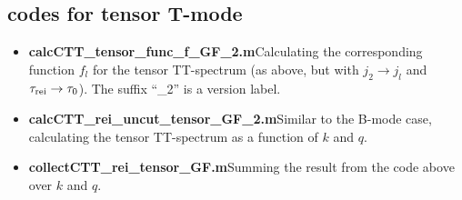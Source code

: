 \documentclass[12pt]{article}
\begin{document}
\subsection*{codes for tensor T-mode}
\begin{itemize}\itemsep0em
\item {\bf calcCTT\_tensor\_func\_f\_GF\_2.m}\quad Calculating the corresponding function $f_l$ for the tensor TT-spectrum (as above, but with $j_2\to j_l$ and $\tau_{\rm rei}\to\tau_0$). The suffix ``\_2'' is a version label.
\item {\bf calcCTT\_rei\_uncut\_tensor\_GF\_2.m}\quad Similar to the B-mode case, calculating the tensor TT-spectrum as a function of $k$ and $q$.
\item {\bf collectCTT\_rei\_tensor\_GF.m}\quad Summing the result from the code above over $k$ and $q$.
\end{itemize}
\end{document}
